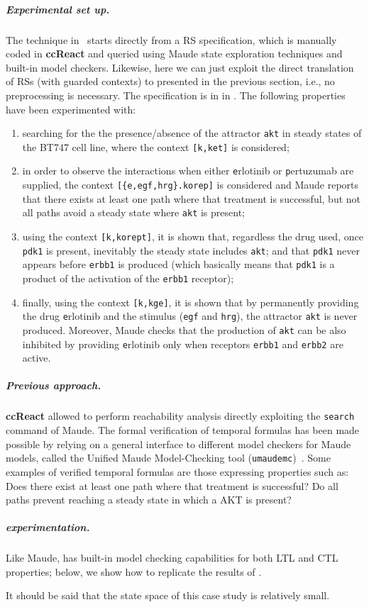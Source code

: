 \subparagraph*{Experimental set up.}
The technique in~\cite{DBLP:conf/cmsb/BallisBFO24} starts directly from a RS specification, which is manually coded in \textbf{ccReact} and queried using Maude state exploration techniques and built-in model checkers. Likewise, here we can just exploit the direct translation of RSs (with guarded contexts) to \GROOVE presented in the previous section, i.e., no preprocessing is necessary. The \BioResolve specification is in  in .
The following properties have been experimented with:
\begin{enumerate}
\item searching for the the presence/absence of the attractor \texttt{akt} in steady states of the BT747 cell line, where the context \verb=[k,ket]= is considered;
\item in order to observe the interactions when either \texttt{e}rlotinib or \texttt{p}ertuzumab are supplied, the context \verb=[{e,egf,hrg}.korep]= is considered and Maude reports that there exists at least one path where that treatment is successful, but not all paths avoid a steady state where \texttt{akt} is present;
\item using the context \verb=[k,korept]=, it is shown that, regardless the drug used, once \texttt{pdk1} is present, inevitably the steady state includes \texttt{akt}; and that \texttt{pdk1} never appears before \texttt{erbb1} is produced (which basically means that \texttt{pdk1} is a product of the activation of the \texttt{erbb1} receptor);
\item finally, using the context \verb=[k,kge]=, it is shown that by permanently providing the drug \texttt{e}rlotinib and the stimulus (\texttt{egf} and \texttt{hrg}), the attractor \texttt{akt} is never produced. Moreover, Maude checks that the production of \texttt{akt} can be also inhibited by providing \texttt{e}rlotinib only when receptors \texttt{erbb1} and \texttt{erbb2} are active.
\end{enumerate}

\subparagraph*{Previous approach.}
\textbf{ccReact} allowed to perform reachability analysis directly exploiting the \texttt{search} command of Maude. 
The formal verification of temporal formulas has been made possible by relying on a general interface to different model checkers for Maude models, called the Unified Maude Model-Checking tool (\texttt{umaudemc})~\cite{DBLP:journals/jlap/RubioMPV21}.
Some examples of verified temporal formulas are those expressing properties such as:
Does there exist at least one path where that treatment is successful?
Do all paths prevent reaching a steady state in which a AKT is present?

\subparagraph*{\GROOVE experimentation.}

Like Maude, \GROOVE has built-in model checking capabilities for both LTL and CTL properties; below, we show how to replicate the results of \cite{DBLP:conf/cmsb/BallisBFO24}.

It should be said that the state space of this case study is relatively small.
